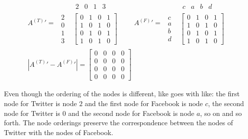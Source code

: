 \begin{align*}
A^{(T)}' = 
\begin{array}{cc} &
\begin{array}{cccc} 2 & 0 & 1 & 3 \end{array}
\\
\begin{array}{cccc}
2 \\
0 \\
1 \\
3 \end{array}
&
\left[
\begin{array}{cccc}
0 & 1 & 0 & 1 \\
1 & 0 & 1 & 0\\
0 & 1 & 0 & 1\\
1 & 0 & 1 & 0
\end{array}
\right]\end{array}
\quad \quad
A^{(F)}' = 
\begin{array}{cc} &
\begin{array}{cccc} c & a & b & d \end{array}
\\
\begin{array}{ccc}
c \\
a \\
b \\
d \end{array}
&
\left[
\begin{array}{cccc}
0 & 1 & 0 & 1 \\
1 & 0 & 1 & 0\\
0 & 1 & 0 & 1\\
1 & 0 & 1 & 0
\end{array}
\right]\end{array} \\
\left|A^{(T)}' - A^{(F)}'\right| = \left[
\begin{array}{cccc}
0 & 0 & 0 & 0\\
0 & 0 & 0 & 0\\
0 & 0 & 0 & 0\\
0 & 0 & 0 & 0\end{array}
\right]
\end{align*}

Even though the ordering of the nodes is different, like goes with like: the first node for Twitter is node $2$ and the first node for Facebook is node $c$, the second node for Twitter is $0$ and the second node for Facebook is node $a$, so on and so forth. The node orderings preserve the correspondence between the nodes of Twitter with the nodes of Facebook.

